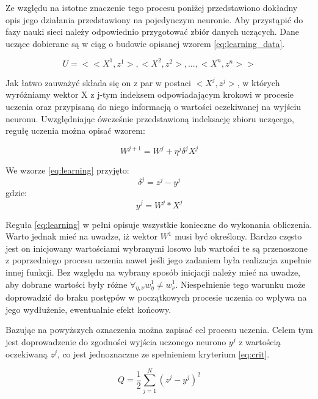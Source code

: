 Ze względu na istotne znaczenie tego procesu poniżej przedstawiono dokładny opis jego działania przedstawiony na pojedynczym neuronie.
Aby przystąpić do fazy nauki sieci należy odpowiednio przygotować zbiór danych uczących. Dane uczące dobierane są w ciąg o budowie opisanej wzorem \ref{eq:learning_data}.

\begin{equation}
U = <<X^{1}, z^{1}>, <X^{2}, z^{2}>,...,<X^{n}, z^{n}>>
\label{eq:learning_data}
\end{equation}

Jak łatwo zauważyć składa się on z par w postaci $<X^{j}, z^{j}>$, w których wyróżniamy wektor X z j-tym indeksem odpowiadającym krokowi w procesie uczenia oraz przypisaną do niego informacją o wartości oczekiwanej na wyjściu neuronu. Uwzględniając ówcześnie przedstawioną indeksację zbioru uczącego, regułę uczenia można opisać wzorem:

\begin{equation}
W^{j+1} = W^{j} + \eta^{j} \delta^{j} X^{j}
\label{eq:learning}
\end{equation}

We wzorze \ref{eq:learning} przyjęto:
\begin{equation}
\delta^{j} = z^{j} - y^{j}
\label{eq:delta}
\end{equation}
gdzie:
\begin{equation}
y^{j} = W^{j} * X^{j}
\label{eq:output}
\end{equation}

Reguła \ref{eq:learning} w pełni opisuje wszystkie konieczne do wykonania obliczenia. Warto jednak mieć na uwadze, iż wektor $W^{1}$ musi być określony. Bardzo często jest on inicjowany wartościami wybranymi losowo lub wartości te są przenoszone z poprzedniego procesu uczenia nawet jeśli jego zadaniem była realizacja zupełnie innej funkcji.
Bez względu na wybrany sposób inicjacji należy mieć na uwadze, aby dobrane wartości były różne $\forall_{\eta, \nu} w^{1}_{\eta} \neq w^{1}_{\nu} $. Niespełnienie tego warunku może doprowadzić do braku postępów w początkowych procesie uczenia co wpływa na jego wydłużenie, ewentualnie efekt końcowy. 

Bazując na powyższych oznaczenia można zapisać cel procesu uczenia. Celem tym jest doprowadzenie do zgodności wyjścia uczonego neurono $y^{j}$ z wartością oczekiwaną $z^{j}$, co jest jednoznaczne ze spełnieniem kryterium \ref{eq:crit}.

\begin{equation}
Q = \frac{1}{2} \sum_{j = 1}^{N} (z^{j} - y^{j})^{2}
\label{eq:crit}
\end{equation}

